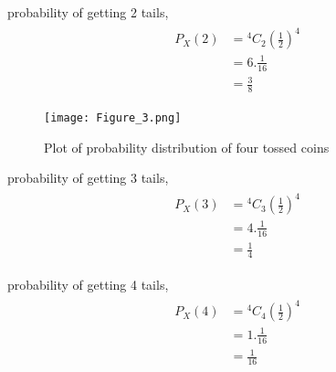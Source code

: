 \documentclass[journal,12pt,twocolumn]{IEEEtran}
\begin{document}
probability of getting 2 tails,
\begin{align}
    \begin{split}
    P_{X}(2) &= {^4C_2}(\frac{1}{2})^4\\
    &=6.\frac{1}{16}\\
    &=\frac{3}{8}
    \end{split}
\end{align}

\begin{figure}[h!]
    \centering
    \texttt{[image: Figure\_3.png]}
    \caption{Plot of probability distribution of four tossed coins}
    \label{fig:Four coins}
\end{figure}

probability of getting 3 tails,
\begin{align}
    \begin{split}
    P_{X}(3) &= {^4C_3}(\frac{1}{2})^4\\
    &=4.\frac{1}{16}\\
    &=\frac{1}{4}
    \end{split}
\end{align}

probability of getting 4 tails,
\begin{align}
    \begin{split}
    P_{X}(4) &= {^4C_4}(\frac{1}{2})^4\\
    &=1.\frac{1}{16}\\
    &=\frac{1}{16}
    \end{split}
\end{align}
\end{document}
